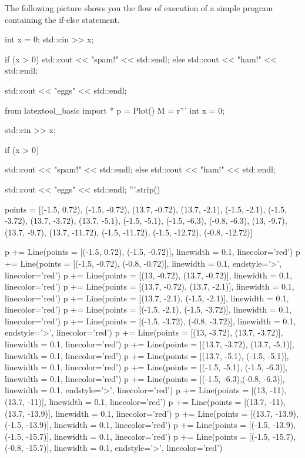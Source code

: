 The following picture shows you the flow of execution of a simple
program containing the if-else statement.
\begin{console}
int x = 0;
std::cin >> x;

if (x > 0)
   std::cout << "spam!" << std::endl;
else
   std::cout << "ham!" << std::endl;
   
std::cout << "eggs" << std::endl;
\end{console}
\begin{python}
from latextool_basic import *
p = Plot()
M = r'''
int x = 0;

std::cin >> x;
                                                                          
if (x > 0)

   std::cout << "spam!" << std::endl;   
else
   std::cout << "ham!" << std::endl;
   
std::cout << "eggs" << std::endl;
'''.strip()

points = [(-1.5, 0.72), (-1.5, -0.72), (13.7, -0.72), (13.7, -2.1), (-1.5, -2.1), (-1.5, -3.72), (13.7, -3.72), (13.7, -5.1), (-1.5, -5.1), (-1.5, -6.3), (-0.8, -6.3), (13, -9.7), (13.7, -9.7), (13.7, -11.72), (-1.5, -11.72), (-1.5, -12.72), (-0.8, -12.72)]

p += Line(points = [(-1.5, 0.72), (-1.5, -0.72)], linewidth = 0.1, linecolor='red')
p += Line(points = [(-1.5, -0.72), (-0.8, -0.72)], linewidth = 0.1, endstyle='>', linecolor='red')
p += Line(points = [(13, -0.72), (13.7, -0.72)], linewidth = 0.1, linecolor='red')
p += Line(points = [(13.7, -0.72), (13.7, -2.1)], linewidth = 0.1, linecolor='red')
p += Line(points = [(13.7, -2.1), (-1.5, -2.1)], linewidth = 0.1, linecolor='red')
p += Line(points = [(-1.5, -2.1), (-1.5, -3.72)], linewidth = 0.1, linecolor='red')
p += Line(points = [(-1.5, -3.72), (-0.8, -3.72)], linewidth = 0.1, endstyle='>', linecolor='red')
p += Line(points = [(13, -3.72), (13.7, -3.72)], linewidth = 0.1, linecolor='red')
p += Line(points = [(13.7, -3.72), (13.7, -5.1)], linewidth = 0.1, linecolor='red')
p += Line(points = [(13.7, -5.1), (-1.5, -5.1)], linewidth = 0.1, linecolor='red')
p += Line(points = [(-1.5, -5.1), (-1.5, -6.3)], linewidth = 0.1, linecolor='red')
p += Line(points = [(-1.5, -6.3),(-0.8, -6.3)], linewidth = 0.1, endstyle='>', linecolor='red')
p += Line(points = [(13, -11), (13.7, -11)], linewidth = 0.1, linecolor='red')
p += Line(points = [(13.7, -11), (13.7, -13.9)], linewidth = 0.1, linecolor='red')
p += Line(points = [(13.7, -13.9), (-1.5, -13.9)], linewidth = 0.1, linecolor='red')
p += Line(points = [(-1.5, -13.9), (-1.5, -15.7)], linewidth = 0.1, linecolor='red')
p += Line(points = [(-1.5, -15.7), (-0.8, -15.7)], linewidth = 0.1, endstyle='>', linecolor='red')



\end{python}
